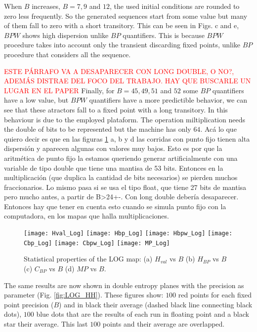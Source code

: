 When $B$ increases, $B=7, 9$ and $12$, the used initial conditions are rounded to zero less frequently.
So the generated sequences start from some value but many of them fall to zero with a short transitory.
This can be seen in Figs. c and e, $BPW$ shows high dispersion unlike $BP$ quantifiers.
This is because $BPW$ procedure takes into account only the transient discarding fixed points, unlike $BP$ procedure that considers all the sequence. 
 
\textcolor{red}{ESTE PÁRRAFO VA A DESAPARECER CON LONG DOUBLE, O NO?, ADEMÁS DISTRAE DEL FOCO DEL TRABAJO. HAY QUE BUSCARLE UN LUGAR EN EL PAPER}
Finally, for $B = 45, 49, 51$ and $52$ some $BP$ quantifiers have a low value, but $BPW$ quantifiers have a more predictible behavior, we can see that these atractors fall to a fixed point with a long transitory.
In this behaviour is due to the employed plataform.
The operation miltiplication needs the double of bits to be represented but the machine has only $64$.
Acá lo que quiero decir es que en las figuras \ref{fig:LOG_QuantiB} a, b y d las corridas con punto fijo tienen alta dispersión y aparecen algunas con valores muy bajos.
Esto es por que la aritmética de punto fijo la estamos queriendo generar artificialmente con una variable de tipo double que tiene una mantisa de 53 bits.
Entonces en la multiplicación (que duplica la cantidad de bits necesarios) se pierden muchos fraccionarios.
Lo mismo pasa si se usa el tipo float, que tiene 27 bits de mantisa pero mucho antes, a partir de B>24+-.
Con long double debería desaparecer.
Entonces hay que tener en cuenta esto cuando se simula punto fijo con la computadora, en los mapas que halla multiplicaciones.

\begin{figure}
	\texttt{[image: Hval\_Log]}
	\texttt{[image: Hbp\_Log]}
	\texttt{[image: Hbpw\_Log]}
	\texttt{[image: Cbp\_Log]}
	\texttt{[image: Cbpw\_Log]}
	\texttt{[image: MP\_Log]}
	\caption{Statistical properties of the LOG map: (a) $H_{val}$ vs $B$ (b) $H_{BP}$ vs $B$ (c) $C_{BP}$ vs $B$ (d) $MP$ vs $B$.}
	\label{fig:LOG_QuantiB}
\end{figure}

The same results are now shown in double entropy planes with the precision as parameter (Fig. \ref{fig:LOG_HH}).
These figures show: $100$ red points for each fixed point precision ($B$) and in black their average (dashed black line connecting black dots), $100$ blue dots that are the results of each run in floating point and a black star their average.
This last $100$ points and their average are overlapped.

